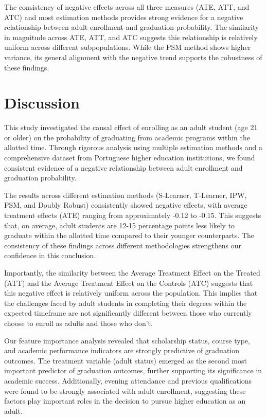 \documentclass{article}
\begin{document}
The consistency of negative effects across all three measures (ATE, ATT, and ATC) and most estimation methods provides strong evidence for a negative relationship between adult enrollment and graduation probability. The similarity in magnitude across ATE, ATT, and ATC suggests this relationship is relatively uniform across different subpopulations. While the PSM method shows higher variance, its general alignment with the negative trend supports the robustness of these findings.

\section{Discussion}

This study investigated the causal effect of enrolling as an adult student (age 21 or older) on the probability of graduating from academic programs within the allotted time. Through rigorous analysis using multiple estimation methods and a comprehensive dataset from Portuguese higher education institutions, we found consistent evidence of a negative relationship between adult enrollment and graduation probability.

The results across different estimation methods (S-Learner, T-Learner, IPW, PSM, and Doubly Robust) consistently showed negative effects, with average treatment effects (ATE) ranging from approximately -0.12 to -0.15. This suggests that, on average, adult students are 12-15 percentage points less likely to graduate within the allotted time compared to their younger counterparts. The consistency of these findings across different methodologies strengthens our confidence in this conclusion.

Importantly, the similarity between the Average Treatment Effect on the Treated (ATT) and the Average Treatment Effect on the Controls (ATC) suggests that this negative effect is relatively uniform across the population. This implies that the challenges faced by adult students in completing their degrees within the expected timeframe are not significantly different between those who currently choose to enroll as adults and those who don't.

Our feature importance analysis revealed that scholarship status, course type, and academic performance indicators are strongly predictive of graduation outcomes. The treatment variable (adult status) emerged as the second most important predictor of graduation outcomes, further supporting its significance in academic success. Additionally, evening attendance and previous qualifications were found to be strongly associated with adult enrollment, suggesting these factors play important roles in the decision to pursue higher education as an adult.
\end{document}
